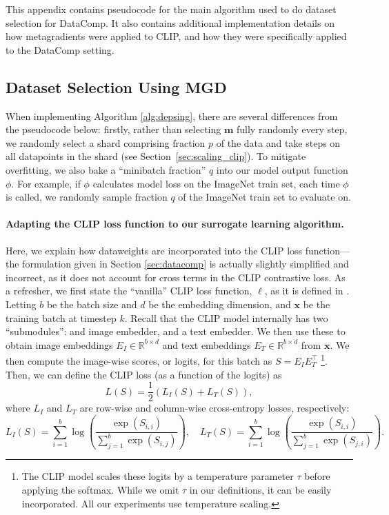 This appendix contains pseudocode for the main algorithm used to do dataset
selection for DataComp. It also contains additional implementation details on
how metagradients were applied to CLIP, and how they were specifically applied
to the DataComp setting.

\subsection{Dataset Selection Using MGD}

When implementing Algorithm \ref{alg:depsing}, there are several differences from the pseudocode below:
firstly, rather than selecting $\mathbf{m}$ fully randomly every step, we
randomly select a shard comprising fraction $p$ of the data and take steps on
all datapoints in the shard (see Section~\ref{sec:scaling_clip}).  To mitigate
overfitting, we also bake a ``minibatch fraction'' $q$ into our model output
function $\phi$.  For example, if $\phi$ calculates model loss on the ImageNet
train set, each time $\phi$ is called, we randomly sample fraction $q$ of the
ImageNet train set to evaluate on.

\paragraph{Adapting the CLIP loss function to our surrogate learning algorithm.}
Here, we explain how dataweights are incorporated into the CLIP loss
function---the formulation given in Section \ref{sec:datacomp} is actually
slightly simplified and incorrect, as it does not account for cross terms in
the CLIP contrastive loss.  As a refresher, we first state the ``vanilla'' CLIP
loss function, $\ell$, as it is defined in \cite{radford2021learning}.  Letting
$b$ be the batch size and $d$ be the embedding dimension, and $\mathbf{x}$ be
the
training batch at timestep $k$.
Recall that the CLIP model internally has two ``submodules'': and image
embedder, and a text embedder.  We then use these to obtain image embeddings
$E_I \in \mathbb{R}^{b \times d}$ and text embeddings $E_T \in
\mathbb{R}^{b \times d}$ from $\mathbf{x}$. We then compute the image-wise
scores, or logits, for this batch as
$S = E_I E_T^\top$ \footnote{The CLIP model scales these logits by a
	temperature parameter $\tau$ before applying the softmax. While we omit
	$\tau$ in our definitions, it can be easily incorporated. All our
experiments use temperature scaling.}.
Then, we can define the CLIP loss (as a function of the logits) as
\begin{equation*}
	L(S) = \frac{1}{2} (L_I(S) + L_T(S)),
\end{equation*}
where $L_I$ and $L_T$ are row-wise and column-wise cross-entropy losses, respectively:
\begin{equation*}
	L_I(S) = \sum_{i=1}^b 
    \log \left(
      \frac{\exp(S_{i,i})}
           {\sum_{j=1}^b \exp(S_{i,j})}
    \right), \quad
	L_T(S) = \sum_{i=1}^b 
    \log \left(
      \frac{\exp(S_{i,i})}
           {\sum_{j=1}^b \exp(S_{j,i})}
    \right).
\end{equation*}

